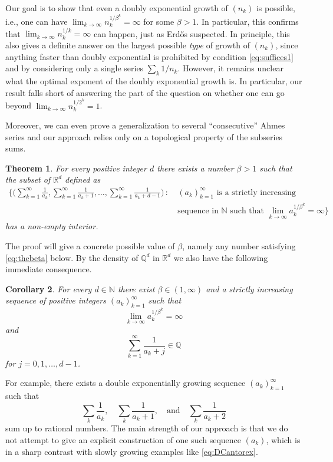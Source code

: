 \documentclass[11pt,letterpaper,reqno]{amsart}
\numberwithin{equation}{section}
\newtheorem{theorem}{Theorem}[section]
\newtheorem{corollary}[theorem]{Corollary}
\theoremstyle{definition}
\numberwithin{equation}{section}
\begin{document}
Our goal is to show that even a doubly exponential growth of $(n_k)$ is possible, i.e., one can have $\lim_{k\to\infty} n_k^{1/\beta^k} = \infty$ for some $\beta>1$. In particular, this confirms that $\lim_{k\to\infty} n_k^{1/k} = \infty$ can happen, just as Erd\H{o}s suspected. In principle, this also gives a definite answer on the largest possible \emph{type} of growth of $(n_k)$, since anything faster than doubly exponential is prohibited by condition \eqref{eq:suffices1} and by considering only a single series $\sum_k 1/n_k$. However, it remains unclear what the optimal exponent of the doubly exponential growth is. In particular, our result falls short of answering the part of the question on whether one can go beyond $\lim_{k\to\infty} n_k^{1/2^k} = 1$.

Moreover, we can even prove a generalization to several ``consecutive'' Ahmes series and our approach relies only on a topological property of the subseries sums.

\begin{theorem}\label{thm:higherD}
For every positive integer $d$ there exists a number $\beta>1$ such that the subset of $\mathbb{R}^d$ defined as
\begin{align*}
\biggl\{ \Big( \sum_{k=1}^{\infty}\frac{1}{a_k}, \sum_{k=1}^{\infty}\frac{1}{a_k+1}, \ldots, \sum_{k=1}^{\infty}\frac{1}{a_k+d-1} \Big) \,:\ & \text{$(a_k)_{k=1}^{\infty}$ is a strictly increasing}\\[-3mm]
& \text{sequence in $\mathbb{N}$ such that } \lim_{k\to\infty} a_k^{1/\beta^k} = \infty \biggr\}
\end{align*}
has a non-empty interior.
\end{theorem}

The proof will give a concrete possible value of $\beta$, namely any number satisfying \eqref{eq:thebeta} below.
By the density of $\mathbb{Q}^d$ in $\mathbb{R}^d$ we also have the following immediate consequence.

\begin{corollary}\label{cor:higherD}
For every $d\in\mathbb{N}$ there exist $\beta\in(1,\infty)$ and a strictly increasing sequence of positive integers $(a_k)_{k=1}^{\infty}$ such that
\[ \lim_{k\to\infty} a_k^{1/\beta^k} = \infty \]
and
\[ \sum_{k=1}^{\infty} \frac{1}{a_k+j} \in \mathbb{Q} \]
for $j=0,1,\ldots,d-1$.
\end{corollary}

For example, there exists a double exponentially growing sequence $(a_k)_{k=1}^{\infty}$ such that
\[ \sum_k \frac{1}{a_k}, \quad \sum_k \frac{1}{a_k+1}, \quad\text{and}\quad \sum_k \frac{1}{a_k+2} \]
sum up to rational numbers.
The main strength of our approach is that we do not attempt to give an explicit construction of one such sequence $(a_k)$, which is in a sharp contrast with slowly growing examples like \eqref{eq:DCantorex}.
\end{document}
